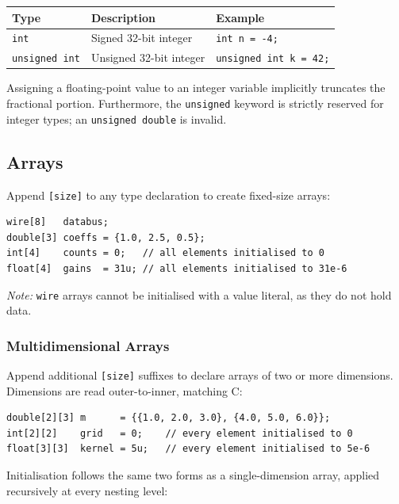 \documentclass[11pt, a4paper]{article}
\newcommand{\code}[1]{\texttt{\small #1}}
\begin{document}
\begin{center}
\begin{tabular}{@{} L{3.2cm} L{5.5cm} L{4cm} @{}}
  \toprule
  \textbf{Type} & \textbf{Description} & \textbf{Example} \\
  \midrule
  \code{int}          & Signed 32-bit integer             & \code{int n = -4;} \\
  \code{unsigned int} & Unsigned 32-bit integer           & \code{unsigned int k = 42;} \\
  \bottomrule
\end{tabular}
\end{center}

Assigning a floating-point value to an integer variable implicitly truncates the fractional portion. Furthermore, the \code{unsigned} keyword is strictly reserved for integer types; an \code{unsigned double} is invalid.

\subsection{Arrays}

Append \code{[size]} to any type declaration to create fixed-size arrays:

\begin{lstlisting}
wire[8]   databus;
double[3] coeffs = {1.0, 2.5, 0.5};
int[4]    counts = 0;   // all elements initialised to 0
float[4]  gains  = 31u; // all elements initialised to 31e-6
\end{lstlisting}

\textit{Note:} \code{wire} arrays cannot be initialised with a value literal, as they do not hold data.

\subsubsection{Multidimensional Arrays}

Append additional \code{[size]} suffixes to declare arrays of two or more dimensions. Dimensions are read outer-to-inner, matching C:

\begin{lstlisting}
double[2][3] m      = {{1.0, 2.0, 3.0}, {4.0, 5.0, 6.0}};
int[2][2]    grid   = 0;    // every element initialised to 0
float[3][3]  kernel = 5u;   // every element initialised to 5e-6
\end{lstlisting}

Initialisation follows the same two forms as a single-dimension array, applied recursively at every nesting level:
\end{document}
